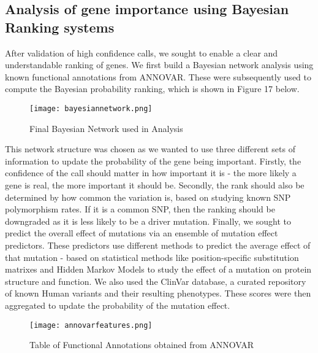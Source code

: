 \documentclass{article}
\begin{document}
\subsection{Analysis of gene importance using Bayesian Ranking systems}
After validation of high confidence calls, we sought to enable a clear and understandable ranking of genes. We first build a Bayesian network analysis using known functional annotations from ANNOVAR. These were subsequently used to compute the Bayesian probability ranking, which is shown in Figure 17 below.


\begin{figure}[H]
\texttt{[image: bayesiannetwork.png]}
\caption{Final Bayesian Network used in Analysis}
\centering
\end{figure}

This network structure was chosen as we wanted to use three different sets of information to update the probability of the gene being important. Firstly, the confidence of the call should matter in how important it is - the more likely a gene is real, the more important it should be. Secondly, the rank should also be determined by how common the variation is, based on studying known SNP polymorphism rates. If it is a common SNP, then the ranking should be downgraded as it is less likely to be a driver mutation. Finally, we sought to predict the overall effect of mutations via an ensemble of mutation effect predictors. These predictors use different methods to predict the average effect of that mutation - based on statistical methods like position-specific substitution matrixes and Hidden Markov Models to study the effect of a mutation on protein structure and function. We also used the ClinVar database, a curated repository of known Human variants and their resulting phenotypes. These scores were then aggregated to update the probability of the mutation effect.

\begin{figure}[H]
\caption{Table of Functional Annotations obtained from ANNOVAR}
\texttt{[image: annovarfeatures.png]}
\centering
\end{figure}
\end{document}
